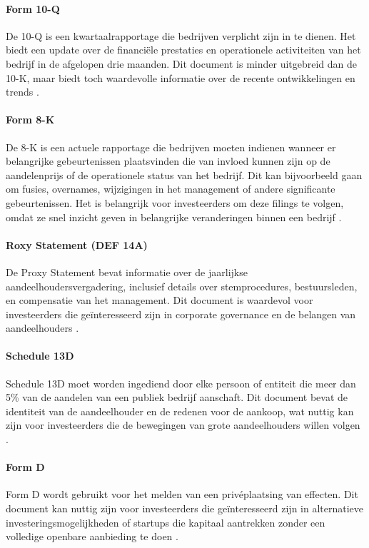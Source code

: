 \paragraph{Form 10-Q}
De 10-Q is een kwartaalrapportage die bedrijven verplicht zijn in te dienen. Het biedt een update over de financiële prestaties en operationele activiteiten van het bedrijf in de afgelopen drie maanden. Dit document is minder uitgebreid dan de 10-K, maar biedt toch waardevolle informatie over de recente ontwikkelingen en trends  \autocite{SECfiling2024} \autocite{Baker2022}.

\paragraph{Form 8-K}
De 8-K is een actuele rapportage die bedrijven moeten indienen wanneer er belangrijke gebeurtenissen plaatsvinden die van invloed kunnen zijn op de aandelenprijs of de operationele status van het bedrijf. Dit kan bijvoorbeeld gaan om fusies, overnames, wijzigingen in het management of andere significante gebeurtenissen. Het is belangrijk voor investeerders om deze filings te volgen, omdat ze snel inzicht geven in belangrijke veranderingen binnen een bedrijf  \autocite{SECfiling2024}\autocite{CFI2024} \autocite{Baker2022}.

\paragraph{Roxy Statement (DEF 14A)}
De Proxy Statement bevat informatie over de jaarlijkse aandeelhoudersvergadering, inclusief details over stemprocedures, bestuursleden, en compensatie van het management. Dit document is waardevol voor investeerders die geïnteresseerd zijn in corporate governance en de belangen van aandeelhouders  \autocite{SECfiling2024} \autocite{Baker2022}.

\paragraph{Schedule 13D}
Schedule 13D moet worden ingediend door elke persoon of entiteit die meer dan 5\% van de aandelen van een publiek bedrijf aanschaft. Dit document bevat de identiteit van de aandeelhouder en de redenen voor de aankoop, wat nuttig kan zijn voor investeerders die de bewegingen van grote aandeelhouders willen volgen \autocite{CFI2024} \autocite{Baker2022}.

\paragraph{Form D}
Form D wordt gebruikt voor het melden van een privéplaatsing van effecten. Dit document kan nuttig zijn voor investeerders die geïnteresseerd zijn in alternatieve investeringsmogelijkheden of startups die kapitaal aantrekken zonder een volledige openbare aanbieding te doen  \autocite{SECfiling2024}.

